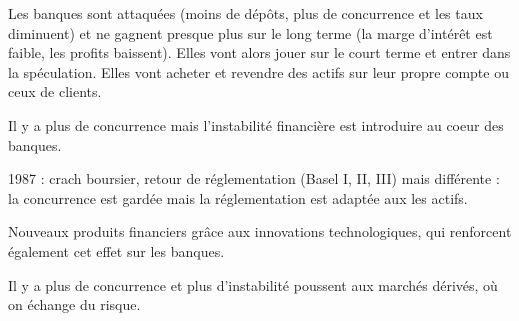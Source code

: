 	Les banques sont attaquées (moins de dépôts, plus de concurrence et les taux diminuent) et ne gagnent presque plus sur le long terme (la marge d'intérêt est faible, les profits baissent). Elles vont alors jouer sur le court terme et entrer dans la spéculation. Elles vont acheter et revendre des actifs sur leur propre compte ou ceux de clients.
	
	Il y a plus de concurrence mais l'instabilité financière est introduire au coeur des banques.
	
	1987 : crach boursier, retour de réglementation (Basel I, II, III) mais différente : la concurrence est gardée mais la réglementation est adaptée aux les actifs.
	
	Nouveaux produits financiers grâce aux innovations technologiques, qui renforcent également cet effet sur les banques.
	
	Il y a plus de concurrence et plus d'instabilité poussent aux marchés dérivés, où on échange du risque.